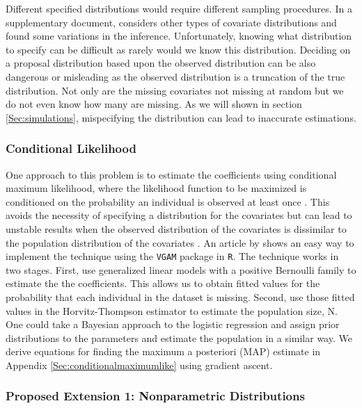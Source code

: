 \documentclass[
  12pt,
]{article}
\begin{document}
Different specified distributions would require different sampling
procedures. In a supplementary document, \cite{royle_analysis_2009}
considers other types of covariate distributions and found some
variations in the inference. Unfortunately, knowing what distribution to
specify can be difficult as rarely would we know this distribution.
Deciding on a proposal distribution based upon the observed distribution
can be also dangerous or misleading as the observed distribution is a
truncation of the true distribution. Not only are the missing covariates
not missing at random but we do not even know how many are missing. As
we will shown in section \ref{Sec:simulations}, mispecifying the
distribution can lead to inaccurate estimations.

\subsubsection{Conditional Likelihood}

One approach to this problem is to estimate the coefficients using
conditional maximum likelihood, where the likelihood function to be
maximized is conditioned on the probability an individual is observed at
least once \citep{alho_logistic_1990,huggins_statistical_1989}. This
avoids the necessity of specifying a distribution for the covariates but
can lead to unstable results when the observed distribution of the
covariates is dissimilar to the population distribution of the
covariates \citep{tilling_capture-recapture_1999}. An article by
\cite{yee_vgam_2015} shows an easy way to implement the technique using
the \texttt{VGAM} package in \texttt{R}. The technique works in two
stages. First, use generalized linear models with a positive Bernoulli
family to estimate the the coefficients. This allows us to obtain fitted
values for the probability that each individual in the dataset is
missing. Second, use those fitted values in the Horvitz-Thompson
estimator \citep{horvitz_generalization_1952} to estimate the population
size, N. One could take a Bayesian approach to the logistic regression
and assign prior distributions to the parameters and estimate the
population in a similar way. We derive equations for finding the maximum
a posteriori (MAP) estimate in Appendix \ref{Sec:conditionalmaximumlike}
using gradient ascent.

\subsubsection{Proposed Extension 1: Nonparametric Distributions}
\end{document}
